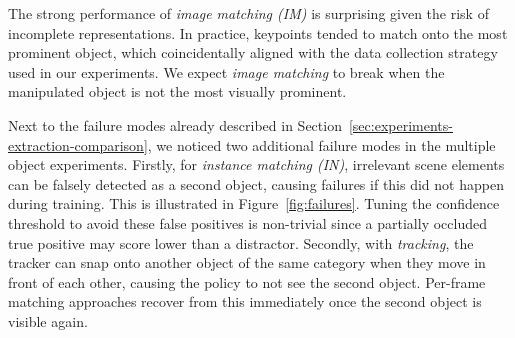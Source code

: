 \documentclass[letterpaper, 10 pt, conference]{ieeeconf}  %
\begin{document}
The strong performance of \textit{image matching (IM)} is surprising given the risk of incomplete representations. In practice, keypoints tended to match onto the most prominent object, which coincidentally aligned with the data collection strategy used in our experiments. We expect \textit{image matching} to break when the manipulated object is not the most visually prominent.

Next to the failure modes already described in Section~\ref{sec:experiments-extraction-comparison}, we noticed two additional failure modes in the multiple object experiments.
Firstly, for \textit{instance matching (IN)}, irrelevant scene elements can be falsely detected as a second object, causing failures if this did not happen during training. This is illustrated in Figure~\ref{fig:failures}.  Tuning the confidence threshold to avoid these false positives is non-trivial since a partially occluded true positive may score lower than a distractor.
Secondly, with \textit{tracking}, the tracker can snap onto another object of the same category when they move in front of each other, causing the policy to not see the second object. Per-frame matching approaches recover from this immediately once the second object is visible again.


\end{document}
